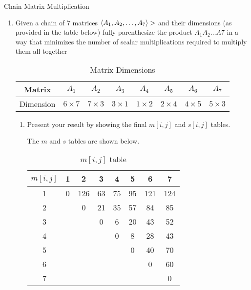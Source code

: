 \documentclass{article}
\numberwithin{table}{section}
\numberwithin{figure}{section}
\begin{document}
\begin{section}{Chain Matrix Multiplication}
\begin{enumerate}
    \item Given a chain of 7 matrices $\left<A_1, A_2, \dots, A_7\right> >$ and their dimensions (as provided in the table below) fully parenthesize the product $A_1 A_2 \dots A7$ in a way that minimizes the number of scalar multiplications required to multiply them all together
    \begin{table}[h]
        \centering
        \begin{tabular}{|c|c|c|c|c|c|c|c|}
             \hline
             Matrix & $A_1$ & $A_2$ & $A_3$ & $A_4$ & $A_5$ & $A_6$ & $A_7$ \\
             \hline
             Dimension & $6 \times 7$ & $7 \times 3$ & $3 \times 1$ & $1 \times 2$ & $2 \times 4$ & $4 \times 5$ &  $5 \times 3$\\
             \hline
        \end{tabular}
        \caption{Matrix Dimensions}
        \label{tab:p3_1}
    \end{table}
    \begin{enumerate}
        \item Present your result by showing the final $m[i, j]$ and $s[i, j]$ tables.
        \begin{tcolorbox}
        The $m$ and $s$ tables are shown below.
            \begin{table}[H]
                \centering
                \begin{tabular}{|c|c|c|c|c|c|c|c|}
                    \hline
                    $m[i,j]$ & 1 & 2 & 3 & 4 & 5 & 6 & 7\\
                    \hline
                    1 & 0 & 126 & 63 & 75 & 95 & 121 & 124\\
                    2 & & 0 & 21 & 35 & 57 & 84 & 85\\
                    3 & & & 0 & 6 & 20 & 43 & 52\\
                    4 & & & & 0 & 8 & 28 & 43\\
                    5 & & & & & 0 & 40 & 70\\
                    6 & & & & & & 0 & 60\\
                    7 & & & & & & & 0\\
                    \hline
                \end{tabular}
                \caption{$m[i,j]$ table}
                \label{tab:p3_b2}
            \end{table}
            \begin{table}[H]
                \centering

\end{table}
\end{tcolorbox}
\end{enumerate}
\end{enumerate}
\end{section}
\end{document}
